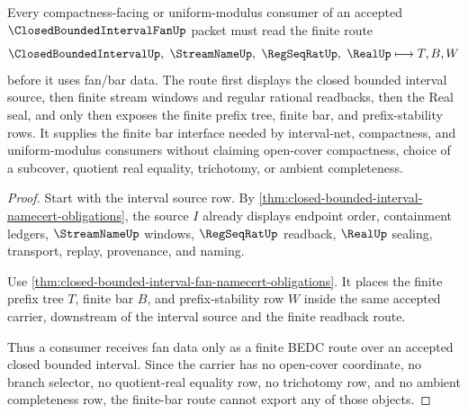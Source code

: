 \begin{theorem}
\label{thm:closed-bounded-interval-fan-finite-bar-route}
Every compactness-facing or uniform-modulus consumer of an accepted $\ClosedBoundedIntervalFanUp$ packet must read the finite route
$$
\ClosedBoundedIntervalUp,\ \StreamNameUp,\ \RegSeqRatUp,\ \RealUp
\longmapsto
T,B,W
$$
before it uses fan/bar data. The route first displays the closed bounded interval source, then finite stream windows and regular rational readbacks, then the Real seal, and only then exposes the finite prefix tree, finite bar, and prefix-stability rows. It supplies the finite bar interface needed by interval-net, compactness, and uniform-modulus consumers without claiming open-cover compactness, choice of a subcover, quotient real equality, trichotomy, or ambient completeness.
\end{theorem}
\begin{proof}
Start with the interval source row. By \autoref{thm:closed-bounded-interval-namecert-obligations}, the source $I$ already displays endpoint order, containment ledgers, $\StreamNameUp$ windows, $\RegSeqRatUp$ readback, $\RealUp$ sealing, transport, replay, provenance, and naming.

Use \autoref{thm:closed-bounded-interval-fan-namecert-obligations}. It places the finite prefix tree $T$, finite bar $B$, and prefix-stability row $W$ inside the same accepted carrier, downstream of the interval source and the finite readback route.

Thus a consumer receives fan data only as a finite BEDC route over an accepted closed bounded interval. Since the carrier has no open-cover coordinate, no branch selector, no quotient-real equality row, no trichotomy row, and no ambient completeness row, the finite-bar route cannot export any of those objects.
\end{proof}


